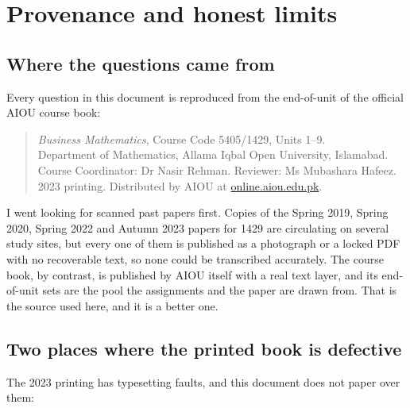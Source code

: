 \setcounter{page}{2}

\chapter*{Provenance and honest limits}

\section*{Where the questions came from}

Every question in this document is reproduced from the end-of-unit
 of the official AIOU course book:

\begin{quote}
\emph{Business Mathematics}, Course Code 5405/1429, Units 1--9.\\
Department of Mathematics, Allama Iqbal Open University, Islamabad.\\
Course Coordinator: Dr Nasir Rehman. Reviewer: Ms Mubashara Hafeez.\\
2023 printing. Distributed by AIOU at
\href{https://online.aiou.edu.pk/LIVE_SITE/SoftBooks/8405.pdf}{online.aiou.edu.pk}.
\end{quote}

I went looking for scanned past papers first. Copies of the Spring 2019,
Spring 2020, Spring 2022 and Autumn 2023 papers for 1429 are circulating on
several study sites, but every one of them is published as a photograph or a
locked PDF with no recoverable text, so none could be transcribed accurately.
The course book, by contrast, is published by AIOU itself with a real text
layer, and its end-of-unit sets are the pool the assignments and the paper are
drawn from. That is the source used here, and it is a better one.

\section*{Two places where the printed book is defective}

The 2023 printing has typesetting faults, and this document does not paper
over them:

